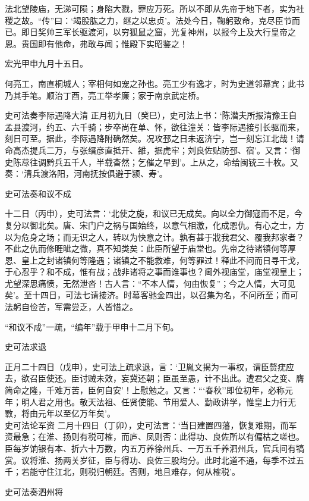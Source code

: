 \documentclass[]{article}
\begin{document}
法北望陵庙，无涕可陨；身陷大戮，罪应万死。所以不即从先帝于地下者，实为社稷之故。``传''曰：`竭股肱之力，继之以忠贞'。法处今日，鞠躬致命，克尽臣节而已。即日奖帅三军长驱渡河，以穷狐鼠之窟，光复神州，以报今上及大行皇帝之恩。贵国即有他命，弗敢与闻；惟殿下实昭鉴之！

宏光甲申九月十五日。

何亮工，南直桐城人；宰相何如宠之孙也。亮工少有逸才，时为史道邻幕宾；此书乃其手笔。顺治丁酉，亮工举孝廉；家于南京武定桥。

史可法奏李际遇降大清
正月初九日（癸巳），史可法上书：`陈潜夫所报清豫王自孟县渡河，约五、六千骑；步卒尚在单、怀，欲往潼关：皆李际遇接引长驱而来，刻日可至。据此，李际遇降附确然矣。况攻邳之日未返济宁，岂一刻忘江北哉！请命高杰提兵二万，与张缙彦直抵开、雒，据虎牢；刘良佐贴防邳、宿'。又言：`御史陈荩往调黔兵五千人，半载杳然；乞催之早到'。上从之，命给闽铳三十枚。又奏：`清兵渡洛阳，河南抚按俱避于颍、寿'。

史可法奏和议不成

十二日（丙申），史可法言：`北使之旋，和议已无成矣。向以全力御寇而不足，今复分以御北矣。唐、宋门户之祸与国始终，以意气相激，化成恩仇。有心之士，方以为危身之场；而无识之人，转以为快意之计。孰有甚于戕我君父、覆我邦家者？不此之仇而修睚眦之微，真不知类矣：此臣所望于庙堂也。先帝之待诸镇何等厚恩、皇上之封诸镇何等隆遇；诸镇之不能救难，何等罪过！释此不问而日寻干戈，于心忍乎？和不成，惟有战；战非诸将之事而谁事也？阃外视庙堂，庙堂视皇上；尤望深思痛愤，无然泄沓！古人言：``不本人情，何由恢复''；今之人情，大可见矣'。至十四日，可法七请接济。时幕客驰金四出，以召集为名，不问所至；而可法躬自俭苦，军需尝乏，人皆惜之。

``和议不成''一疏，``编年''载于甲申十二月下旬。

史可法求退

正月二十四日（戊申），史可法上疏求退，言：`卫胤文揭为一事权，谓臣赘疣应去，欲召臣使还。臣讨贼未效，妄冀还朝；臣虽至愚，计不出此。遭君父之变、膺简命之隆，千难万苦，臣何自安'！上慰勉之。又言：```春秋''即位初年，必称元年；明人君之用也。敬天法祖、任贤使能、节用爱人、勤政讲学，惟皇上力行无斁，将由元年以至亿万年矣'。\\
史可法论军资
二月十四日（丁卯），史可法言：`当日建置四藩，恢复难期，而军资最急；在淮、扬则有税可榷，而庐、凤则否：此得功、良佐所以有偏枯之嗟也。臣每岁饷银有本、折六十万数，内五万养徐州兵、一万五千养泗州兵，官兵间有犒赏。议将淮、扬两关岁征，臣与得功、良佐三股均分。此时北道不通，每季不过五千；若能守住江北，则税归朝廷。否则，地且难存，何从榷税'。

史可法奏泗州将
\end{document}
